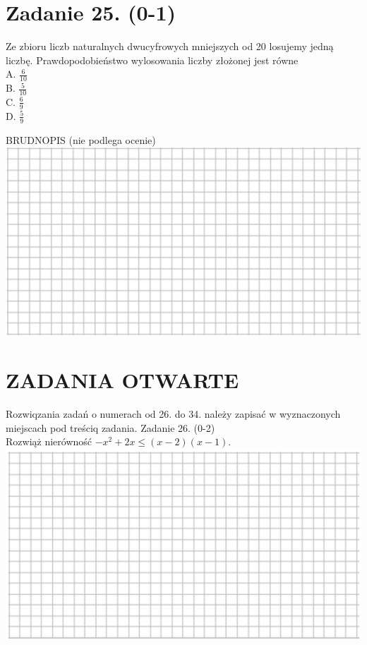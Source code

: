 \documentclass[10pt]{article}
\begin{document}
\section*{Zadanie 25. (0-1)}
Ze zbioru liczb naturalnych dwucyfrowych mniejszych od 20 losujemy jedną liczbę. Prawdopodobieństwo wylosowania liczby złożonej jest równe\\
A. \(\frac{6}{10}\)\\
B. \(\frac{5}{10}\)\\
C. \(\frac{6}{9}\)\\
D. \(\frac{5}{9}\)

BRUDNOPIS (nie podlega ocenie)\\
\includegraphics[max width=\textwidth, center]{2024_11_21_ba65d61981011633d840g-10}

\section*{ZADANIA OTWARTE}
Rozwiqzania zadań o numerach od 26. do 34. należy zapisać w wyznaczonych miejscach pod treściq zadania. Zadanie 26. (0-2)\\
Rozwiąż nierówność \(-x^{2}+2 x \leq(x-2)(x-1)\).\\
\includegraphics[max width=\textwidth, center]{2024_11_21_ba65d61981011633d840g-11(1)}
\end{document}
